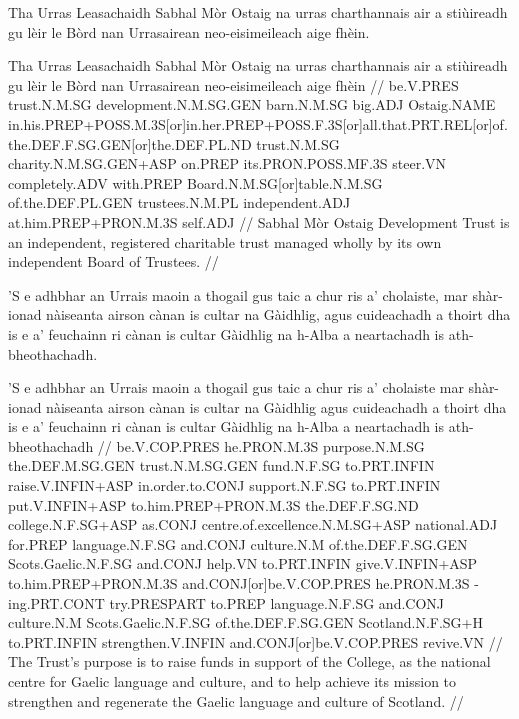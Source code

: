 \documentclass[a4paper,10pt]{article}
\begin{document}
\ex
\begingl
\glpre Tha Urras Leasachaidh Sabhal Mòr Ostaig na urras charthannais air a stiùireadh gu lèir le Bòrd nan Urrasairean neo-eisimeileach aige fhèin. 

\vspace{4mm}
\gla Tha Urras Leasachaidh Sabhal Mòr Ostaig na urras charthannais air a stiùireadh {gu lèir} le Bòrd nan Urrasairean neo-eisimeileach aige fhèin  //
\glb be.V.PRES trust.N.M.SG development.N.M.SG.GEN barn.N.M.SG big.ADJ Ostaig.NAME in.his.PREP+POSS.M.3S[or]in.her.PREP+POSS.F.3S[or]all.that.PRT.REL[or]of.the.DEF.F.SG.GEN[or]the.DEF.PL.ND trust.N.M.SG charity.N.M.SG.GEN+ASP on.PREP its.PRON.POSS.MF.3S steer.VN completely.ADV with.PREP Board.N.M.SG[or]table.N.M.SG of.the.DEF.PL.GEN trustees.N.M.PL independent.ADJ at.him.PREP+PRON.M.3S self.ADJ  //
\glft Sabhal Mòr Ostaig Development Trust is an independent, registered charitable trust managed wholly by its own independent Board of Trustees. //
\endgl
\xe

\ex
\begingl
\glpre 'S e adhbhar an Urrais maoin a thogail gus taic a chur ris a' cholaiste, mar shàr-ionad nàiseanta airson cànan is cultar na Gàidhlig, agus cuideachadh a thoirt dha is e a' feuchainn ri cànan is cultar Gàidhlig na h-Alba a neartachadh is ath-bheothachadh. 

\vspace{4mm}
\gla 'S e adhbhar an Urrais maoin a thogail gus taic a chur ris a' cholaiste mar shàr-ionad nàiseanta airson cànan is cultar na Gàidhlig agus cuideachadh a thoirt dha is e a' feuchainn ri cànan is cultar Gàidhlig na h-Alba a neartachadh is ath-bheothachadh  //
\glb be.V.COP.PRES he.PRON.M.3S purpose.N.M.SG the.DEF.M.SG.GEN trust.N.M.SG.GEN fund.N.F.SG to.PRT.INFIN raise.V.INFIN+ASP in.order.to.CONJ support.N.F.SG to.PRT.INFIN put.V.INFIN+ASP to.him.PREP+PRON.M.3S the.DEF.F.SG.ND college.N.F.SG+ASP as.CONJ centre.of.excellence.N.M.SG+ASP national.ADJ for.PREP language.N.F.SG and.CONJ culture.N.M of.the.DEF.F.SG.GEN Scots.Gaelic.N.F.SG and.CONJ help.VN to.PRT.INFIN give.V.INFIN+ASP to.him.PREP+PRON.M.3S and.CONJ[or]be.V.COP.PRES he.PRON.M.3S -ing.PRT.CONT try.PRESPART to.PREP language.N.F.SG and.CONJ culture.N.M Scots.Gaelic.N.F.SG of.the.DEF.F.SG.GEN Scotland.N.F.SG+H to.PRT.INFIN strengthen.V.INFIN and.CONJ[or]be.V.COP.PRES revive.VN  //
\glft The Trust's purpose is to raise funds in support of the College, as the national centre for Gaelic language and culture, and to help achieve its mission to strengthen and regenerate the Gaelic language and culture of Scotland. //
\endgl
\xe
\end{document}
